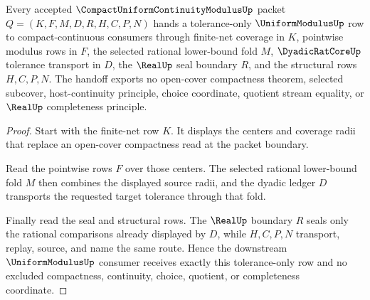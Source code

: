 \begin{theorem}
\label{thm:lebesgue-number-lemma-closed-interval-compactness-handoff}
Every accepted $\CompactUniformContinuityModulusUp$ packet $Q=(K,F,M,D,R,H,C,P,N)$ hands a tolerance-only $\UniformModulusUp$ row to compact-continuous consumers through finite-net coverage in $K$, pointwise modulus rows in $F$, the selected rational lower-bound fold $M$, $\DyadicRatCoreUp$ tolerance transport in $D$, the $\RealUp$ seal boundary $R$, and the structural rows $H,C,P,N$. The handoff exports no open-cover compactness theorem, selected subcover, host-continuity principle, choice coordinate, quotient stream equality, or $\RealUp$ completeness principle.
\end{theorem}
\begin{proof}
Start with the finite-net row $K$. It displays the centers and coverage radii that replace an open-cover compactness read at the packet boundary.

Read the pointwise rows $F$ over those centers. The selected rational lower-bound fold $M$ then combines the displayed source radii, and the dyadic ledger $D$ transports the requested target tolerance through that fold.

Finally read the seal and structural rows. The $\RealUp$ boundary $R$ seals only the rational comparisons already displayed by $D$, while $H,C,P,N$ transport, replay, source, and name the same route. Hence the downstream $\UniformModulusUp$ consumer receives exactly this tolerance-only row and no excluded compactness, continuity, choice, quotient, or completeness coordinate.
\end{proof}

\begin{closurestatus}{\CompactUniformContinuityModulusUp}
  \theoryclosure{\seedClosure}
  \formalstatus{\unformalizedV}
\end{closurestatus}
